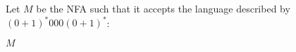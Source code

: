 Let $M$ be the NFA such that it accepts the language described by $(0+1)^*000(0+1)^*$:
\begin{automata}{$M$}
	
	
	
\end{automata}